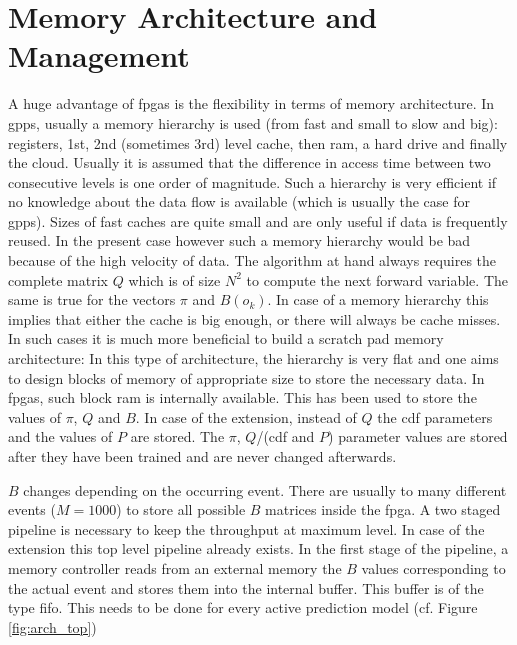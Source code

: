 \documentclass[mscthesis]{usiinfthesis}
\begin{document}
\section{Memory Architecture and Management}
\label{ch:design_mem}

A huge advantage of \glspl{fpga} is the flexibility in terms of memory
architecture. In \glspl{gpp}, usually a memory hierarchy is used (from fast and
small to slow and big): registers, 1st, 2nd (sometimes 3rd) level cache, then
\gls{ram}, a hard drive and finally the cloud. Usually it is assumed that the
difference in access time between two consecutive levels is one order of
magnitude. Such a hierarchy is very efficient if no knowledge about the data
flow is available (which is usually the case for \glspl{gpp}). Sizes of fast
caches are quite small and are only useful if data is frequently reused. In the
present case however such a memory hierarchy would be bad because of the
high velocity of data. The algorithm at hand always requires the complete
matrix $Q$ which is of size $N^2$ to compute the next forward variable. The
same is true for the vectors $\pi$ and $B(o_k)$. In case of a memory hierarchy
this implies that either the cache is big enough, or there will always be
cache misses. In such cases it is much more beneficial to build a scratch pad
memory architecture: In this type of architecture, the hierarchy is very flat
and one aims to design blocks of memory of appropriate size to store the
necessary data. In \glspl{fpga}, such block ram is internally available. This
has been used to store the values of $\pi$, $Q$ and $B$. In case of the
extension, instead of $Q$ the \gls{cdf} parameters and the values of $P$ are
stored. The $\pi$, $Q$/(\gls{cdf} and $P$) parameter values are stored after
they have been trained and are never changed afterwards.

$B$ changes depending on the occurring event. There are usually to many
different events ($M=1000$) to store all possible $B$ matrices inside the
\gls{fpga}. A two staged pipeline is necessary to keep the throughput at
maximum level. In case of the extension this top level pipeline already
exists. In the first stage of the pipeline, a memory controller reads from an
external memory the $B$ values corresponding to the actual event and stores
them into the internal buffer. This buffer is of the type \gls{fifo}. This
needs to be done for every active prediction model (cf. Figure
\ref{fig:arch_top})
\end{document}
